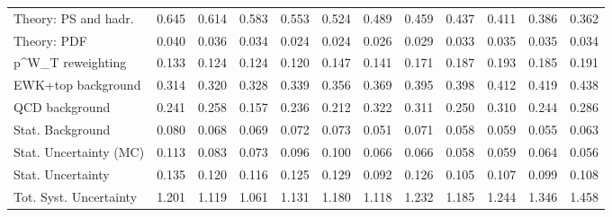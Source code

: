 \begin{tabular}{l|p{0.6cm}p{0.6cm}p{0.6cm}p{0.6cm}p{0.6cm}p{0.6cm}p{0.6cm}p{0.6cm}p{0.6cm}p{0.6cm}p{0.6cm}}
Theory: PS and hadr.                     & 0.645 & 0.614 & 0.583 & 0.553 & 0.524 & 0.489 & 0.459 & 0.437 & 0.411 & 0.386 & 0.362 \\
Theory: PDF                              & 0.040 & 0.036 & 0.034 & 0.024 & 0.024 & 0.026 & 0.029 & 0.033 & 0.035 & 0.035 & 0.034 \\
p^{W}_{T} reweighting                    & 0.133 & 0.124 & 0.124 & 0.120 & 0.147 & 0.141 & 0.171 & 0.187 & 0.193 & 0.185 & 0.191 \\
EWK+top background                       & 0.314 & 0.320 & 0.328 & 0.339 & 0.356 & 0.369 & 0.395 & 0.398 & 0.412 & 0.419 & 0.438 \\
QCD background                           & 0.241 & 0.258 & 0.157 & 0.236 & 0.212 & 0.322 & 0.311 & 0.250 & 0.310 & 0.244 & 0.286 \\
Stat. Background                         & 0.080 & 0.068 & 0.069 & 0.072 & 0.073 & 0.051 & 0.071 & 0.058 & 0.059 & 0.055 & 0.063 \\
Stat. Uncertainty (MC)                   & 0.113 & 0.083 & 0.073 & 0.096 & 0.100 & 0.066 & 0.066 & 0.058 & 0.059 & 0.064 & 0.056 \\
\hline
Stat. Uncertainty                        & 0.135 & 0.120 & 0.116 & 0.125 & 0.129 & 0.092 & 0.126 & 0.105 & 0.107 & 0.099 & 0.108 \\
\hline
Tot. Syst. Uncertainty                   & 1.201 & 1.119 & 1.061 & 1.131 & 1.180 & 1.118 & 1.232 & 1.185 & 1.244 & 1.346 & 1.458 \\
\hline
\end{tabular}
